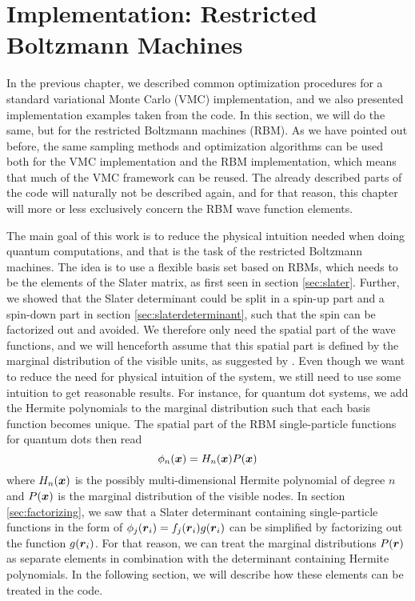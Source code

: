 \chapter{Implementation: Restricted Boltzmann Machines} \label{chp:rbmimplementation}
In the previous chapter, we described common optimization procedures for a standard variational Monte Carlo (VMC) implementation, and we also presented implementation examples taken from the code. In this section, we will do the same, but for the restricted Boltzmann machines (RBM). As we have pointed out before, the same sampling methods and optimization algorithms can be used both for the VMC implementation and the RBM implementation, which means that much of the VMC framework can be reused. The already described parts of the code will naturally not be described again, and for that reason, this chapter will more or less exclusively concern the RBM wave function elements.

The main goal of this work is to reduce the physical intuition needed when doing quantum computations, and that is the task of the restricted Boltzmann machines. The idea is to use a flexible basis set based on RBMs, which needs to be the elements of the Slater matrix, as first seen in section \ref{sec:slater}. Further, we showed that the Slater determinant could be split in a spin-up part and a spin-down part in section \ref{sec:slaterdeterminant}, such that the spin can be factorized out and avoided. We therefore only need the spatial part of the wave functions, and we will henceforth assume that this spatial part is defined by the marginal distribution of the visible units, as suggested by \citeauthor{carleo_solving_2017} \cite{giuseppe_carleo_neural-network_2017,carleo_solving_2017}. Even though we want to reduce the need for physical intuition of the system, we still need to use some intuition to get reasonable results. For instance, for quantum dot systems, we add the Hermite polynomials to the marginal distribution such that each basis function becomes unique. The spatial part of the RBM single-particle functions for quantum dots then read
\begin{equation}
\phi_n(\boldsymbol{{x}})=H_n(\boldsymbol{{x}})P(\boldsymbol{{x}})
\end{equation}
where $H_n(\boldsymbol{{x}})$ is the possibly multi-dimensional Hermite polynomial of degree $n$ and $P(\boldsymbol{{x}})$ is the marginal distribution of the visible nodes. In section \ref{sec:factorizing}, we saw that a Slater determinant containing single-particle functions in the form of $\phi_j(\boldsymbol{{r}}_i)=f_j(\boldsymbol{{r}}_i)g(\boldsymbol{{r}}_i)$ can be simplified by factorizing out the function $g(\boldsymbol{{r}}_i)$. For that reason, we can treat the marginal distributions $P(\boldsymbol{{r}})$ as separate elements in combination with the determinant containing Hermite polynomials. In the following section, we will describe how these elements can be treated in the code. 

